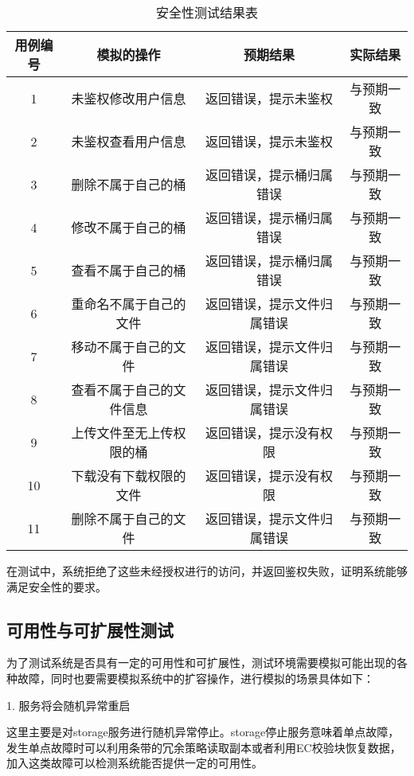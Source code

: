 \begin{table}[h]
  \centering
  \caption{安全性测试结果表}
  \begin{tabular}{cccc}
    \toprule
    用例编号 & 模拟的操作   & 预期结果 & 实际结果  \\
    \midrule
    1  & 未鉴权修改用户信息       & 返回错误，提示未鉴权       & 与预期一致\\
    2  & 未鉴权查看用户信息       & 返回错误，提示未鉴权       & 与预期一致\\
    3  & 删除不属于自己的桶       & 返回错误，提示桶归属错误    & 与预期一致 \\
    4  & 修改不属于自己的桶       & 返回错误，提示桶归属错误    & 与预期一致\\
    5  & 查看不属于自己的桶       & 返回错误，提示桶归属错误    & 与预期一致 \\
    6  & 重命名不属于自己的文件    & 返回错误，提示文件归属错误  & 与预期一致\\
    7  & 移动不属于自己的文件      & 返回错误，提示文件归属错误  & 与预期一致\\
    8  & 查看不属于自己的文件信息   & 返回错误，提示文件归属错误  & 与预期一致   \\
    9  & 上传文件至无上传权限的桶   & 返回错误，提示没有权限      & 与预期一致\\
    10 & 下载没有下载权限的文件     & 返回错误，提示没有权限      & 与预期一致\\
    11 & 删除不属于自己的文件       & 返回错误，提示文件归属错误   & 与预期一致 \\
    \bottomrule
  \end{tabular}
\end{table}

在测试中，系统拒绝了这些未经授权进行的访问，并返回鉴权失败，证明系统能够满足安全性的要求。

\subsection{可用性与可扩展性测试}%

为了测试系统是否具有一定的可用性和可扩展性，测试环境需要模拟可能出现的各种故障，同时也要需要模拟系统中的扩容操作，进行模拟的场景具体如下：

1. 服务将会随机异常重启

这里主要是对storage服务进行随机异常停止。storage停止服务意味着单点故障，发生单点故障时可以利用条带的冗余策略读取副本或者利用EC校验块恢复数据，加入这类故障可以检测系统能否提供一定的可用性。

